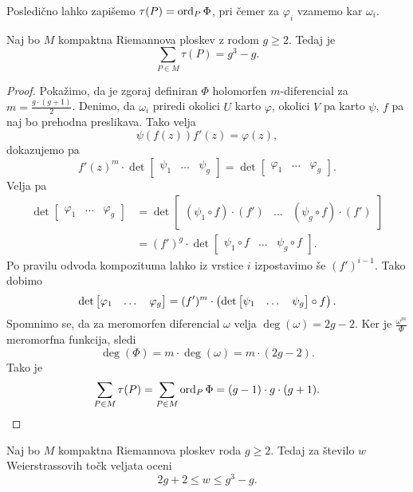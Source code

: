Posledično lahko zapišemo $\tau(P) = \operatorname{ord}_P \Phi$, pri čemer za
$\varphi_i$ vzamemo kar $\omega_i$.

\begin{trditev}
Naj bo $M$ kompaktna Riemannova ploskev z rodom $g \geq 2$. Tedaj
je
\[
\sum_{P \in M} \tau(P) = g^3-g.
\]
\end{trditev}

\begin{proof}
Pokažimo, da je zgoraj definiran $\Phi$ holomorfen $m$-diferencial
za $m = \frac{g \cdot (g+1)}{2}$. Denimo, da $\omega_i$ priredi
okolici $U$ karto $\varphi$, okolici $V$ pa karto $\psi$, $f$ pa
naj bo prehodna preslikava. Tako velja
\[
\psi(f(z)) f'(z) = \varphi(z),
\]
dokazujemo pa
\[
f'(z)^m \cdot \det
\begin{bmatrix}
\psi_1 & \dots & \psi_g
\end{bmatrix}
=
\det
\begin{bmatrix}
\varphi_1 & \dots & \varphi_g
\end{bmatrix}.
\]
Velja pa
\begin{align*}
\det
\begin{bmatrix}
\varphi_1 & \dots & \varphi_g
\end{bmatrix}
&=
\det
\begin{bmatrix}
(\psi_1 \circ f) \cdot (f') & \dots & (\psi_g \circ f) \cdot (f')
\end{bmatrix}
\\
&=
(f')^g \cdot \det
\begin{bmatrix}
\psi_1 \circ f & \dots & \psi_g \circ f
\end{bmatrix}.
\end{align*}
Po pravilu odvoda kompozituma lahko iz vrstice $i$ izpostavimo še
$(f')^{i-1}$. Tako dobimo
\[
\det
\begin{bmatrix}
\varphi_1 & \dots & \varphi_g
\end{bmatrix}
=
(f')^m \cdot \left(\det
\begin{bmatrix}
\psi_1 & \dots & \psi_g
\end{bmatrix}
\circ f\right).
\]
Spomnimo se, da za meromorfen diferencial $\omega$ velja
$\deg (\omega) = 2g - 2$. Ker je $\frac{\omega^m}{\Phi}$ meromorfna
funkcija, sledi
\[
\deg (\Phi) = m \cdot \deg (\omega) = m \cdot (2g - 2).
\]
Tako je
\[
\sum_{P \in M} \tau(P) =
\sum_{P \in M} \operatorname{ord}_P \Phi =
(g-1) \cdot g \cdot (g+1). \qedhere
\]
\end{proof}

\begin{trditev}
Naj bo $M$ kompaktna Riemannova ploskev roda $g \geq 2$. Tedaj za
število $w$ Weierstrassovih točk veljata oceni
\[
2g + 2 \leq w \leq g^3 - g.
\]
\end{trditev}

